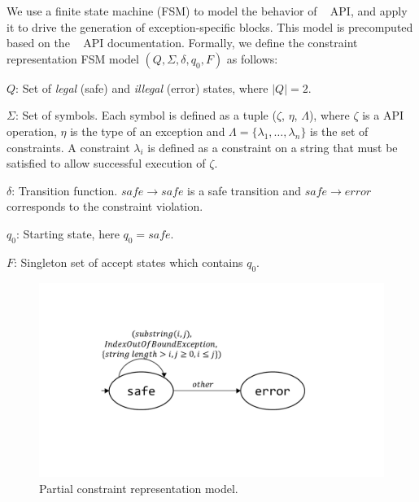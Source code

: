   We use a finite state machine
(FSM) to model the behavior of \java\  API, and apply it to drive
the generation of exception-specific  blocks. This model is
precomputed based on the \java\  API documentation. Formally, we
define the constraint representation FSM model $(Q, \Sigma, \delta, q_0, F)$ as
follows:
\begin{mybullet}
 \item $Q$: Set of \emph{legal} (safe) and \emph{illegal} (error) states, where
$|Q| = 2$. %

 \item $\Sigma$: Set of symbols. Each symbol is defined as a tuple ($\zeta$,
$\eta$, $\Lambda$), where $\zeta$ is a  API operation, $\eta$ is
the type of an exception and $\Lambda = \{\lambda_1, \ldots, \lambda_n\}$  is
the set of constraints. A constraint $\lambda_i$ is defined as a constraint on
a string that must be satisfied to allow successful execution of $\zeta$.

 \item $\delta$: Transition function. $safe \rightarrow safe$ is a safe
transition and $safe \rightarrow error$ corresponds to the constraint violation.

 \item $q_0$: Starting state, here $q_0 = safe$.

 \item $F$: Singleton set of accept states which contains $q_0$.
\end{mybullet}

\begin{figure}[t]
\centering
\includegraphics[scale=.28]{images/automataString.pdf}
\caption{Partial constraint representation model.}
\label{fig:constraintautomata}
\end{figure}


